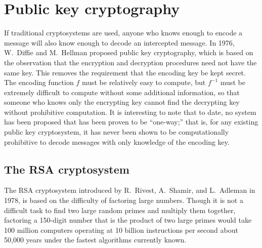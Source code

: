 \section{Public key cryptography}
\label{sec:Cryptography:PublicKey}
  
If traditional cryptosystems are used, anyone who knows enough to
encode a message will also know enough to decode an intercepted
message. In 1976, W.~Diffie and
M.~Hellman proposed public key cryptography, which
is based on the observation that the encryption and decryption
procedures need not have the same key. This removes the requirement
that the encoding key be kept secret. The encoding function $f$ must
be relatively easy to compute, but $f^{-1}$ must be extremely
difficult to compute without some additional information, so that
someone who knows only the encrypting key cannot find the decrypting
key without prohibitive computation. It is interesting to note that to
date, no system has been proposed that has been proven to be
``one-way;'' that is, for any existing public key cryptosystem, it has
never been shown to be computationally prohibitive to decode messages
with only knowledge of the encoding key. 
 
 
 
\subsection{The RSA cryptosystem\quad
{}}\label{sec:RSA}
 
The RSA cryptosystem introduced by R.~Rivest,
A.~Shamir, and L.~Adleman in
1978, is based on the difficulty of factoring large numbers. Though it
is not a difficult task to find two large random primes and multiply
them together, factoring a 150-digit number that is the product of two
large primes would take 100 million computers operating at 10 billion
instructions per second about 50,000 years under the fastest
algorithms currently known.
 
